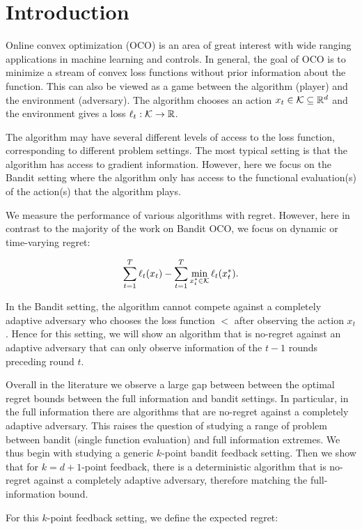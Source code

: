 \section{Introduction}\label{sec:intro}

Online convex optimization (OCO) is an area of great interest with wide ranging applications in machine learning and controls. In general, the goal of OCO is to minimize a stream of convex loss functions without prior information about the function. This can also be viewed as a game between the algorithm (player) and the environment (adversary). The algorithm chooses an action $x_t \in \mathcal{K} \subseteq \mathbb{R}^d$ and the environment gives a loss $\ell_t : \mathcal{K} \rightarrow \mathbb{R}$. 

The algorithm may have several different levels of access to the loss function, corresponding to different problem settings. The most typical setting is that the algorithm has access to gradient information. However, here we focus on the Bandit setting where the algorithm only has access to the functional evaluation(s) of the action(s) that the algorithm plays.

We measure the performance of various algorithms with regret. However, here in contrast to the majority of the work on Bandit OCO, we focus on dynamic or time-varying regret:

$$\sum_{t=1}^T \ell_t(x_t) -  \sum_{t=1}^T \min_{x^*_t\in \mathcal{K}}\ell_t(x^*_t).$$

In the Bandit setting, the algorithm cannot compete against a completely adaptive adversary who chooses the loss function $\lt$ after observing the action $x_t$ \cite{agarwal2010optimal}. Hence for this setting, we will show an algorithm that is no-regret against an adaptive adversary that can only observe information of the $t-1$ rounds preceding round $t$.

Overall in the literature we observe a large gap between between the optimal regret bounds between the full information and bandit settings. In particular, in the full information there are algorithms that are no-regret against a completely adaptive adversary. This raises the question of studying a range of problem between bandit (single function evaluation) and full information extremes. We thus begin with studying a generic $k$-point bandit feedback setting. Then we show that for $k=d+1$-point feedback, there is a deterministic algorithm that is no-regret against a completely adaptive adversary, therefore matching the full-information bound. 

For this $k$-point feedback setting, we define the expected regret:

